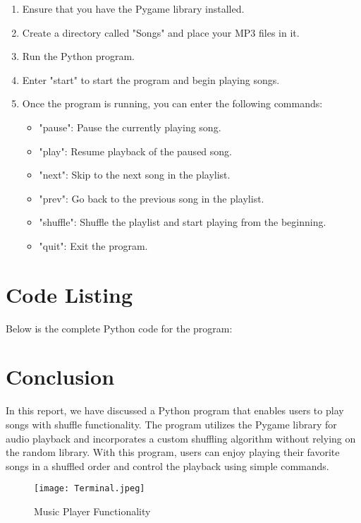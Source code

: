 \documentclass{article}
\begin{document}
\begin{enumerate}
    \item Ensure that you have the Pygame library installed.
    \item Create a directory called "Songs" and place your MP3 files in it.
    \item Run the Python program.
    \item Enter "start" to start the program and begin playing songs.
    \item Once the program is running, you can enter the following commands:
    \begin{itemize}
        \item "pause": Pause the currently playing song.
        \item "play": Resume playback of the paused song.
        \item "next": Skip to the next song in the playlist.
        \item "prev": Go back to the previous song in the playlist.
        \item "shuffle": Shuffle the playlist and start playing from the beginning.
        \item "quit": Exit the program.
    \end{itemize}
\end{enumerate}

\section{Code Listing}
Below is the complete Python code for the program:



\section{Conclusion}
In this report, we have discussed a Python program that enables users to play songs with shuffle functionality. The program utilizes the Pygame library for audio playback and incorporates a custom shuffling algorithm without relying on the random library. With this program, users can enjoy playing their favorite songs in a shuffled order and control the playback using simple commands.

\begin{figure}[ht]
        \centering
        \texttt{[image: Terminal.jpeg]}
        \caption{Music Player Functionality}
        \label{fig:view}
\end{figure}
\end{document}
